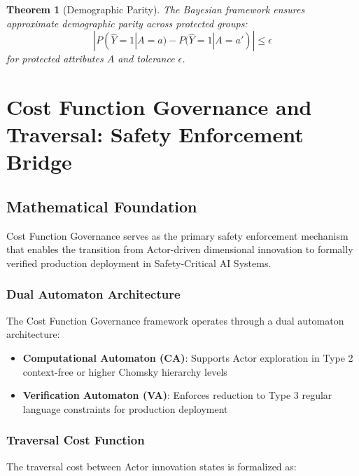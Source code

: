 \documentclass[12pt,a4paper]{article}
\newtheorem{theorem}{Theorem}
\begin{document}
\begin{theorem}[Demographic Parity]
The Bayesian framework ensures approximate demographic parity across protected groups:
\begin{equation}
|P(\hat{Y} = 1|A = a) - P(\hat{Y} = 1|A = a')| \leq \epsilon
\end{equation}
for protected attributes $A$ and tolerance $\epsilon$.
\end{theorem}

\clearpage

\section{Cost Function Governance and Traversal: Safety Enforcement Bridge}

\subsection{Mathematical Foundation}

Cost Function Governance serves as the primary safety enforcement mechanism that enables the transition from Actor-driven dimensional innovation to formally verified production deployment in Safety-Critical AI Systems.

\subsubsection{Dual Automaton Architecture}

The Cost Function Governance framework operates through a dual automaton architecture:

\begin{itemize}
    \item \textbf{Computational Automaton (CA)}: Supports Actor exploration in Type 2 context-free or higher Chomsky hierarchy levels
    \item \textbf{Verification Automaton (VA)}: Enforces reduction to Type 3 regular language constraints for production deployment
\end{itemize}

\subsubsection{Traversal Cost Function}

The traversal cost between Actor innovation states is formalized as:
\end{document}
